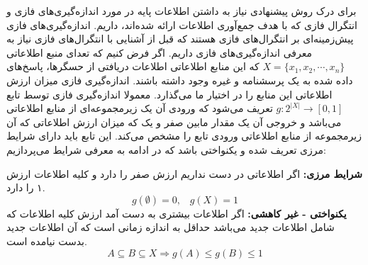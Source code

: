 \label{SEC:FI_PREVIEW}
برای درک روش پیشنهادی نیاز به داشتن اطلاعات پایه در مورد اندازه‌گیری‌های فازی و انتگرال فازی که با هدف جمع‌آوری اطلاعات ارائه شده‌اند، داریم. اندازه‌گیری‌های فازی پیش‌زمینه‌ای بر انتگرال‌های فازی هستند که قبل از آشنایی با انتگرال‌های فازی نیاز به معرفی اندازه‌گیری‌های فازی داریم. اگر فرض کنیم که تعدای منبع اطلاعاتی
$X = \{x_1, x_2, \cdots, x_n\}$
که این منابع اطلاعاتی اطلاعات دریافتی از حسگرها، پاسخ‌های داده شده به یک پرسشنامه و غیره وجود داشته باشند. اندازه‌گیری فازی میزان ارزش اطلاعاتی این منابع را در اختیار ما می‌گذارد. معمولا اندازه‌گیری فازی توسط تابع
$g : 2^{|X|} \rightarrow [0, 1]$
تعریف می‌شود که ورودی آن یک زیرمجموعه‌ای از منابع اطلاعاتی می‌باشد و خروجی آن یک مقدار مابین صفر و یک که میزان ارزش اطلاعاتی که آن زیرمجموعه از منابع اطلاعاتی ورودی تابع را مشخص می‌کند.
این تابع باید دارای شرایط مرزی تعریف شده و یکنواختی باشد که در ادامه به معرفی شرایط می‌پردازیم:

\begin{enumerate}
 \textbf{شرایط مرزی:}
اگر اطلاعاتی در دست نداریم ارزش صفر را دارد و کلیه اطلاعات ارزش ۱ را دارد.
\begin{equation}
g(\emptyset) = 0,\hspace{10pt} g(X) = 1
\end{equation}
 \textbf{یکنواختی - غیر کاهشی:}
اگر اطلاعات بیشتری به دست آمد ارزش کلیه اطلاعات که شامل اطلاعات جدید می‌باشد حداقل به اندازه زمانی است که آن اطلاعات جدید بدست نیامده است.
\begin{equation}
A \subseteq B \subseteq X \Rightarrow g(A) \leq g(B) \leq 1
\end{equation}
\end{enumerate}

%


